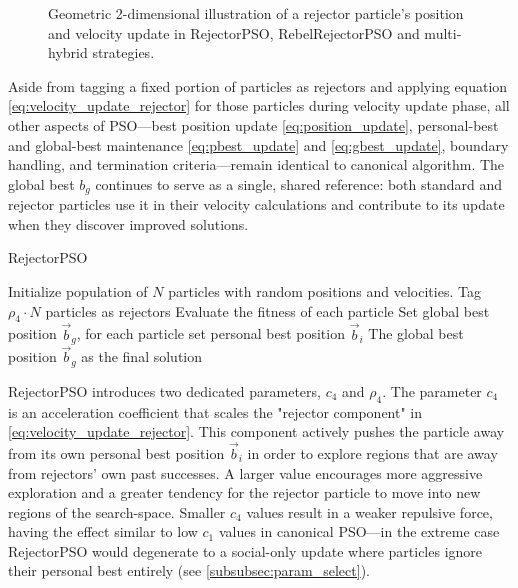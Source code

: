 {\begin{figure}[H]
\begin{tikzpicture}
    \end{tikzpicture}
    \caption[Geometric illustration of rejector particle's position and velocity update]{Geometric 2-dimensional illustration of a rejector particle's position and velocity update in RejectorPSO, RebelRejectorPSO and multi-hybrid strategies.}
    \label{fig:RejectorPSO_geometric_illustration}
\end{figure}

Aside from tagging 
a fixed portion of particles as rejectors and applying equation \eqref{eq:velocity_update_rejector} for those particles during velocity update phase, all other aspects of PSO---best position update \eqref{eq:position_update}, personal-best and global-best maintenance \eqref{eq:pbest_update} and \eqref{eq:gbest_update}, boundary handling, and termination criteria---remain identical to canonical algorithm. The global best 
$b_g$ continues to serve as a single, shared reference: both standard and rejector particles use it in their velocity calculations and contribute to its update when they discover improved solutions. 

\vspace{.935em}
\begin{algorithm}[H]
\caption{RejectorPSO}\label{alg:rejector}
Initialize population of \(N\) particles with random positions and velocities. Tag \(\rho_4 \cdot N\) particles as rejectors\;
Evaluate the fitness of each particle\;
Set global best position \(\vec{b}_g\), for each particle set personal best position \(\vec{b}_i\)\;
\Return The global best position \(\vec{b}_g\) as the final solution\;
\end{algorithm}
\vspace{.935em}

RejectorPSO introduces two dedicated parameters, $c_4$ and $\rho_4$. The parameter $c_4$ is an acceleration coefficient that scales the "rejector component" in \eqref{eq:velocity_update_rejector}. This component actively pushes the particle away from its own personal best position $\vec{b}_i$ in order to explore regions that are away from rejectors' own past successes.
A larger value encourages more aggressive exploration and a greater tendency for the rejector particle to move into new regions of the \gls{search-space}. Smaller $c_4$ values result in a weaker repulsive force, having the effect similar to low $c_1$ values in canonical PSO---in the extreme case RejectorPSO would degenerate to a social\-\mbox{-only} update where particles ignore their personal best entirely (see \autoref{subsubsec:param_select}).

}
